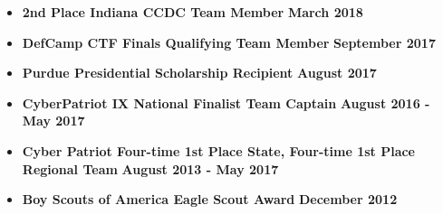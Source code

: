 \documentclass[letterpaper,10pt]{article}
\begin{document}
\begin{flushleft}
\begin{itemize}
		\item \textbf{2nd Place Indiana CCDC Team Member} \hfill \textbf{March 2018} \\
		\item \textbf{DefCamp CTF Finals Qualifying Team Member} \hfill \textbf{September 2017} \\
		\item \textbf{Purdue Presidential Scholarship Recipient} \hfill \textbf{August 2017} \\
		\item \textbf{CyberPatriot IX National Finalist Team Captain} \hfill \textbf{August 2016 - May 2017} \\
		\item \textbf{Cyber Patriot Four-time 1st Place State, Four-time 1st Place Regional Team} \hfill \textbf{August 2013 - May 2017} \\
		\item \textbf{Boy Scouts of America Eagle Scout Award} \hfill \textbf{December 2012}
	\end{itemize}
\end{flushleft}
\end{document}
